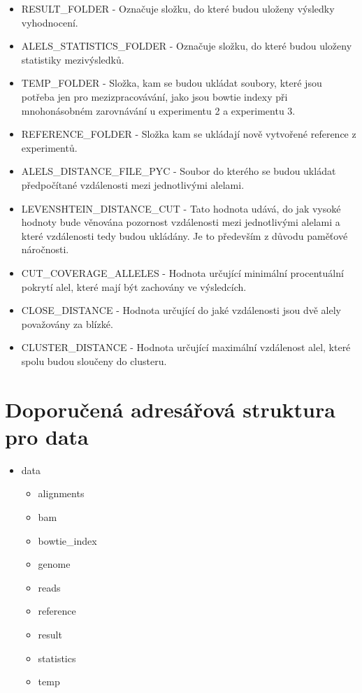 \documentclass[czech,DP]{thesiskiv}
\numberwithin{equation}{section}
\begin{document}
\begin{itemize}
	\item RESULT\_FOLDER - Označuje složku, do které budou uloženy výsledky vyhodnocení.
	\item ALELS\_STATISTICS\_FOLDER - Označuje složku, do které budou uloženy statistiky mezivýsledků.
	\item TEMP\_FOLDER - Složka, kam se budou ukládat soubory, které jsou potřeba jen pro mezizpracovávání, jako jsou bowtie indexy při mnohonásobném zarovnávání u experimentu 2 a experimentu  3.
	\item REFERENCE\_FOLDER - Složka kam se ukládají nově vytvořené reference z experimentů.
	\item ALELS\_DISTANCE\_FILE\_PYC - Soubor do kterého se budou ukládat předpočítané vzdálenosti mezi jednotlivými alelami. 
	\item LEVENSHTEIN\_DISTANCE\_CUT - Tato hodnota udává, do jak vysoké hodnoty bude věnována pozornost vzdálenosti mezi jednotlivými alelami a které vzdálenosti tedy budou ukládány. Je to především z důvodu paměťové náročnosti.
	\item CUT\_COVERAGE\_ALLELES - Hodnota určující minimální procentuální pokrytí alel, které mají být zachovány ve výsledcích.
	 \item CLOSE\_DISTANCE - Hodnota určující do jaké vzdálenosti jsou dvě alely považovány za blízké.
	 \item CLUSTER\_DISTANCE - Hodnota určující maximální vzdálenost alel, které spolu budou sloučeny do clusteru.
\end{itemize}



\section{Doporučená adresářová struktura pro data}
\begin{itemize}
	\item data
		\begin{itemize}
			\item alignments
			\item bam
			\item bowtie\_index
			\item genome
			\item reads
			\item reference			
			\item result
			\item statistics 
			\item temp
		\end{itemize}
\end{itemize}
\end{document}
